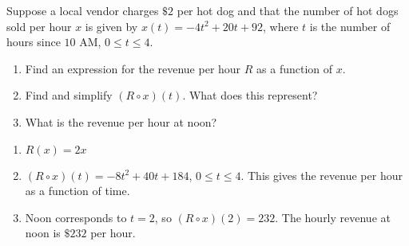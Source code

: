 {Suppose a local vendor charges $\$2$ per hot dog and that the number of hot dogs sold per hour $x$ is given by $x(t) = -4t^2+20t+92$, where $t$ is the number of hours since $10$ AM, $0 \leq t \leq 4$.

\begin{enumerate}

\item  Find an expression for the revenue per hour $R$ as a function of $x$.
\item  Find and simplify $\left(R \circ x\right)(t)$.  What does this represent?
\item  What is the revenue per hour at noon?

\end{enumerate}}
{ \begin{enumerate}

\item  $R(x) = 2x$

\item  $\left(R \circ x \right)(t) =  -8t^2+40t+184$, $0 \leq t \leq 4$.  This gives the revenue per hour as a function of time.

\item  Noon corresponds to $t=2$, so $\left(R \circ x \right)(2) = 232$.  The hourly revenue at noon is $\$232$ per hour. 

\end{enumerate}}